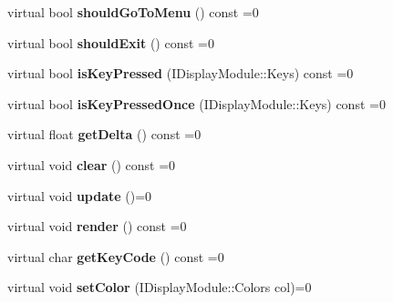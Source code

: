 \begin{DoxyCompactItemize}
virtual bool {\bfseries should\+Go\+To\+Menu} () const =0
\item 
\mbox{\label{classArcade_1_1Display_1_1IDisplayModule_a550877fb92d58325404b9ebe9e71f6ff}} 
virtual bool {\bfseries should\+Exit} () const =0
\item 
\mbox{\label{classArcade_1_1Display_1_1IDisplayModule_ab3d02b76c08ff2deb728dc9f0d557f43}} 
virtual bool {\bfseries is\+Key\+Pressed} (I\+Display\+Module\+::\+Keys) const =0
\item 
\mbox{\label{classArcade_1_1Display_1_1IDisplayModule_ac347fc77c01e12c5ce23be99d357008d}} 
virtual bool {\bfseries is\+Key\+Pressed\+Once} (I\+Display\+Module\+::\+Keys) const =0
\item 
\mbox{\label{classArcade_1_1Display_1_1IDisplayModule_aab078d82e6fdd32682553947c20226ac}} 
virtual float {\bfseries get\+Delta} () const =0
\item 
\mbox{\label{classArcade_1_1Display_1_1IDisplayModule_a4892b758c6710f45d4dcebe70f801639}} 
virtual void {\bfseries clear} () const =0
\item 
\mbox{\label{classArcade_1_1Display_1_1IDisplayModule_a1ca0c1052dccb78eb470e36e6f557e60}} 
virtual void {\bfseries update} ()=0
\item 
\mbox{\label{classArcade_1_1Display_1_1IDisplayModule_a012f5804e7dc45515ef8e85e7ca8de5a}} 
virtual void {\bfseries render} () const =0
\item 
\mbox{\label{classArcade_1_1Display_1_1IDisplayModule_a403f8a0f065dad707a881ef3cee79805}} 
virtual char {\bfseries get\+Key\+Code} () const =0
\item 
\mbox{\label{classArcade_1_1Display_1_1IDisplayModule_a89ff355335d968e2bd3de8d200d3b535}} 
virtual void {\bfseries set\+Color} (I\+Display\+Module\+::\+Colors col)=0

\end{DoxyCompactItemize}
